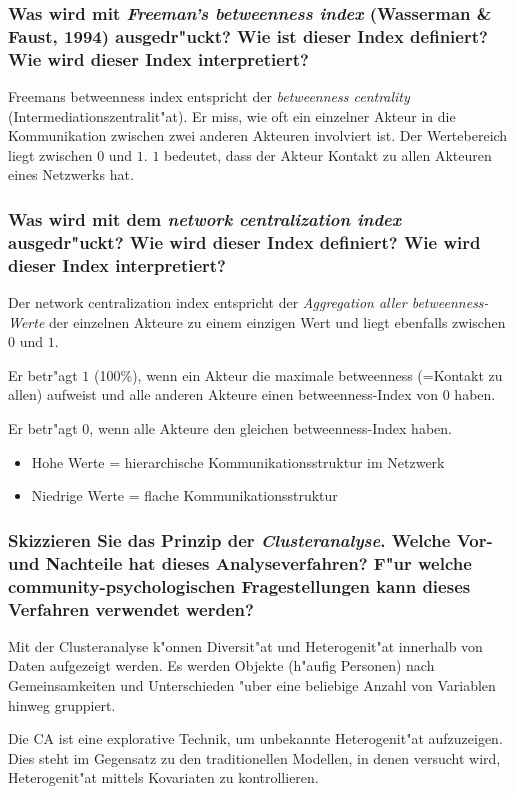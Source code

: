 \subsubsection{Was wird mit \emph{Freeman's betweenness index} (Wasserman \& Faust, 1994) ausgedr"uckt? Wie ist dieser Index definiert? Wie wird dieser Index interpretiert?}
Freemans betweenness index entspricht der \emph{betweenness centrality} (Intermediationszentralit"at). Er miss, wie oft ein einzelner Akteur in die Kommunikation zwischen zwei anderen Akteuren involviert ist. Der Wertebereich liegt zwischen $0$ und $1$. $1$ bedeutet, dass der Akteur Kontakt zu allen Akteuren eines Netzwerks hat. 

\subsubsection{Was wird mit dem \emph{network centralization index} ausgedr"uckt? Wie wird dieser Index definiert? Wie wird dieser Index interpretiert?}
Der network centralization index entspricht der \emph{Aggregation aller betweenness-Werte} der einzelnen Akteure zu einem einzigen Wert und liegt ebenfalls zwischen $0$ und $1$. 

Er betr"agt $1$ (100\%), wenn ein Akteur die maximale betweenness (=Kontakt zu allen) aufweist und alle anderen Akteure einen betweenness-Index von $0$ haben.

Er betr"agt $0$, wenn alle Akteure den gleichen betweenness-Index haben.
\begin{itemize}
  \item Hohe Werte = hierarchische Kommunikationsstruktur im Netzwerk
  \item Niedrige Werte = flache Kommunikationsstruktur
\end{itemize}

\subsubsection{Skizzieren Sie das Prinzip der \emph{Clusteranalyse}. Welche Vor- und Nachteile hat dieses Analyseverfahren? F"ur welche community-psychologischen Fragestellungen kann dieses Verfahren verwendet werden?}
Mit der Clusteranalyse k"onnen Diversit"at und Heterogenit"at innerhalb von Daten aufgezeigt werden. Es werden Objekte (h"aufig Personen) nach Gemeinsamkeiten und Unterschieden "uber eine beliebige Anzahl von Variablen hinweg gruppiert.

Die CA ist eine explorative Technik, um unbekannte Heterogenit"at aufzuzeigen. Dies steht im Gegensatz zu den traditionellen Modellen, in denen versucht wird, Heterogenit"at mittels Kovariaten zu kontrollieren.

